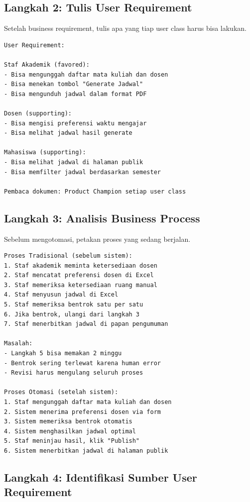 \documentclass[11pt,a4paper]{article}
\begin{document}
\subsection{Langkah 2: Tulis User Requirement}

Setelah business requirement, tulis apa yang tiap user class harus bisa lakukan.

\begin{lstlisting}[style=out]
User Requirement:

Staf Akademik (favored):
- Bisa mengunggah daftar mata kuliah dan dosen
- Bisa menekan tombol "Generate Jadwal"
- Bisa mengunduh jadwal dalam format PDF

Dosen (supporting):
- Bisa mengisi preferensi waktu mengajar
- Bisa melihat jadwal hasil generate

Mahasiswa (supporting):
- Bisa melihat jadwal di halaman publik
- Bisa memfilter jadwal berdasarkan semester

Pembaca dokumen: Product Champion setiap user class
\end{lstlisting}

\subsection{Langkah 3: Analisis Business Process}

Sebelum mengotomasi, petakan proses yang sedang berjalan.

\begin{lstlisting}[style=out]
Proses Tradisional (sebelum sistem):
1. Staf akademik meminta ketersediaan dosen
2. Staf mencatat preferensi dosen di Excel
3. Staf memeriksa ketersediaan ruang manual
4. Staf menyusun jadwal di Excel
5. Staf memeriksa bentrok satu per satu
6. Jika bentrok, ulangi dari langkah 3
7. Staf menerbitkan jadwal di papan pengumuman

Masalah:
- Langkah 5 bisa memakan 2 minggu
- Bentrok sering terlewat karena human error
- Revisi harus mengulang seluruh proses

Proses Otomasi (setelah sistem):
1. Staf mengunggah daftar mata kuliah dan dosen
2. Sistem menerima preferensi dosen via form
3. Sistem memeriksa bentrok otomatis
4. Sistem menghasilkan jadwal optimal
5. Staf meninjau hasil, klik "Publish"
6. Sistem menerbitkan jadwal di halaman publik
\end{lstlisting}

\subsection{Langkah 4: Identifikasi Sumber User Requirement}
\end{document}
